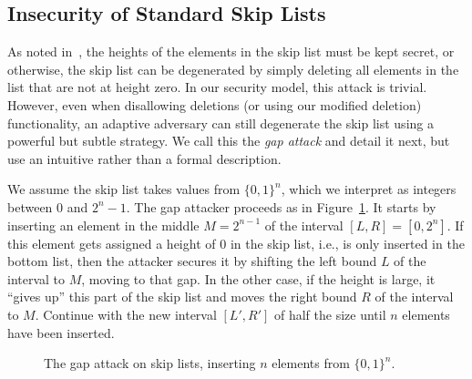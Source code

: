 \subsection{Insecurity of Standard Skip Lists}\label{sec:gap-attack}

As noted in~\cite{pugh}, the heights of the elements in the skip list must be kept secret, or otherwise, the skip list can be degenerated by simply deleting all elements in the list that are not at height zero. In our security model, this attack is trivial. However, even when disallowing deletions (or using our modified deletion) functionality, an adaptive adversary can still degenerate the skip list using a powerful but subtle strategy. We call this the \emph{gap attack} and detail it next, but use an intuitive rather than a formal description.

We assume the skip list takes values from $\{0,1\}^n$, which we interpret as integers between $0$ and $2^n-1$. The gap attacker proceeds as in Figure~\ref{fig:gap}. It starts by inserting an element in the middle $M=2^{n-1}$ of the interval $[L,R]=[0,2^{n}]$. If this element gets assigned a height of $0$ in the skip list, i.e., is only inserted in the bottom list, then the attacker secures it by shifting the left bound $L$ of the interval to $M$, moving to that gap. In the other case, if the height is large, it ``gives up'' this part of the skip list and moves the right bound $R$ of the interval to $M$. Continue with the new interval $[L',R']$ of half the size until $n$ elements have been inserted.
\begin{figure}[thp]
		\centering
		\begin{pchstack}[boxed,center,space=0.5em]
		\end{pchstack}
  \caption[The Gap Attack.]{The gap attack on skip lists, inserting $n$ elements from $\{0,1\}^n$.   
  } 
  \label{fig:gap}
\end{figure}

